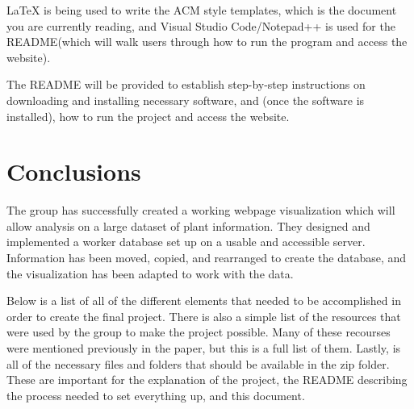 \documentclass{Group6_Phase2}
\begin{document}
LaTeX is being used to write the ACM style templates, which is the document you are currently reading, and Visual Studio Code/Notepad++ is used for the README(which will walk users through how to run the program and access the website).

The README will be provided to establish step-by-step instructions on downloading and installing necessary software, and (once the software is installed), how to run the project and access the website. 


\section{Conclusions}
The group has successfully created a working webpage visualization which will allow analysis on a large dataset of plant information. They designed and implemented a worker database set up on a usable and accessible server. Information has been moved, copied, and rearranged to create the database, and the visualization has been adapted to work with the data.

Below is a list of all of the different elements that needed to be accomplished in order to create the final project. There is also a simple list of the resources that were used by the group to make the project possible. Many of these recourses were mentioned previously in the paper, but this is a full list of them. Lastly, is all of the necessary files and folders that should be available in the zip folder. These are important for the explanation of the project, the README describing the process needed to set everything up, and this document.
\end{document}
